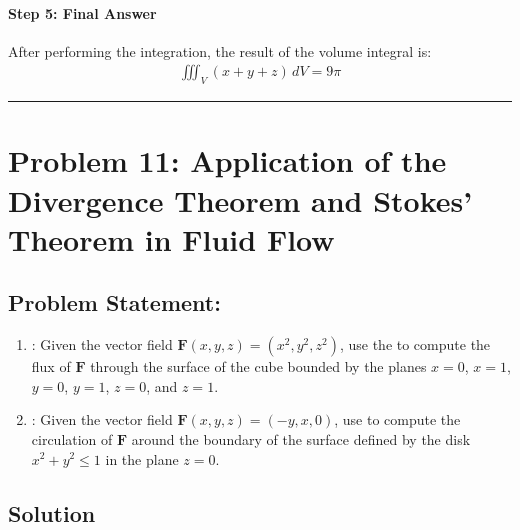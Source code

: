 \documentclass[letterpaper,10pt,english]{jupyterBook}
\begin{document}
\paragraph{Step 5: Final Answer}
\label{\detokenize{prerequisites:step-5-final-answer}}
\sphinxAtStartPar
After performing the integration, the result of the volume integral is:
\begin{equation*}
\begin{split}
\iiint_V (x + y + z) \, dV = 9\pi
\end{split}
\end{equation*}

\bigskip\hrule\bigskip



\section{Problem 11: Application of the Divergence Theorem and Stokes’ Theorem in Fluid Flow}
\label{\detokenize{prerequisites:problem-11-application-of-the-divergence-theorem-and-stokes-theorem-in-fluid-flow}}

\subsection{Problem Statement:}
\label{\detokenize{prerequisites:id13}}\begin{enumerate}
%
\item {} 
\sphinxAtStartPar
{}: Given the vector field \( \mathbf{F}(x, y, z) = (x^2, y^2, z^2) \), use the  to compute the flux of \( \mathbf{F} \) through the surface of the cube bounded by the planes \( x = 0 \), \( x = 1 \), \( y = 0 \), \( y = 1 \), \( z = 0 \), and \( z = 1 \).

\item {} 
\sphinxAtStartPar
{}: Given the vector field \( \mathbf{F}(x, y, z) = (-y, x, 0) \), use  to compute the circulation of \( \mathbf{F} \) around the boundary of the surface defined by the disk \( x^2 + y^2 \leq 1 \) in the plane \( z = 0 \).

\end{enumerate}


\subsection{Solution}
\label{\detokenize{prerequisites:id14}}
\end{document}

